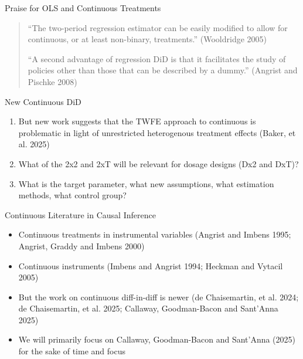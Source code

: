 \documentclass{beamer}
\begin{document}
\begin{frame}{Praise for OLS and Continuous Treatments}

\begin{quote}
``The two-period regression estimator can be easily modified to allow for continuous, or at least non-binary, treatments.'' (Wooldridge 2005)

\bigskip

``A second advantage of regression DiD is that it facilitates the study of policies other than those that can be described by a dummy.'' (Angrist and Pischke 2008)

\end{quote}

\end{frame}

\clearpage




\begin{frame}{New Continuous DiD}

\begin{enumerate}
\item But new work suggests that the TWFE approach to continuous is problematic in light of unrestricted heterogenous treatment effects (Baker, et al. 2025)
\item What of the 2x2 and 2xT will be relevant for dosage designs (Dx2 and DxT)?
\item What is the target parameter, what new assumptions, what estimation methods, what control group?
\end{enumerate}

\end{frame}



\begin{frame}{Continuous Literature in Causal Inference}

\begin{itemize}
\item Continuous treatments in instrumental variables (Angrist and Imbens 1995; Angrist, Graddy and Imbens 2000)
\item Continuous instruments (Imbens and Angrist 1994; Heckman and Vytacil 2005)
\item But the work on continuous diff-in-diff is newer (de Chaisemartin, et al. 2024; de Chaisemartin, et al. 2025; Callaway, Goodman-Bacon and Sant'Anna 2025)
\item We will primarily focus on Callaway, Goodman-Bacon and Sant'Anna (2025) for the sake of time and focus

\end{itemize}

\end{frame}
\end{document}
